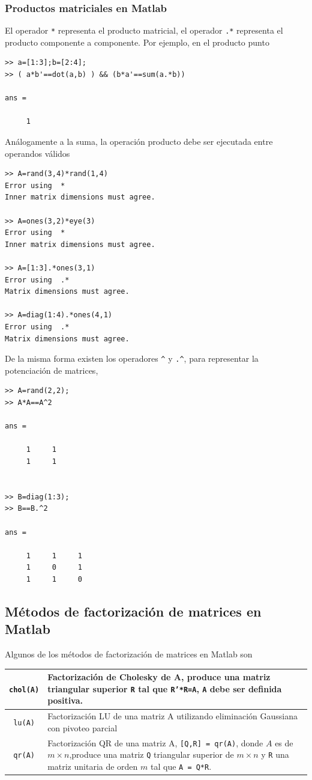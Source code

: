\documentclass[11pt]{article}
\begin{document}
\subsubsection{Productos matriciales en Matlab}
El operador \texttt{*} representa el producto matricial, el operador \texttt{.*} representa el producto componente 
a componente. Por ejemplo, en el producto punto
\begin{verbatim}
>> a=[1:3];b=[2:4];
>> ( a*b'==dot(a,b) ) && (b*a'==sum(a.*b))

ans =

     1
\end{verbatim}
An\'alogamente a la suma, la operaci\'on producto debe ser ejecutada entre operandos v\'alidos
\begin{multicols}{2}
\begin{verbatim}
>> A=rand(3,4)*rand(1,4)
Error using  * 
Inner matrix dimensions must agree.

>> A=ones(3,2)*eye(3)
Error using  * 
Inner matrix dimensions must agree.

>> A=[1:3].*ones(3,1)
Error using  .* 
Matrix dimensions must agree.
 
>> A=diag(1:4).*ones(4,1)
Error using  .* 
Matrix dimensions must agree.
\end{verbatim}
\end{multicols}
De la misma forma existen los operadores \texttt{\^} y \texttt{.\^}, para representar la potenciaci\'on de matrices,
\begin{multicols}{2}
\begin{verbatim}
>> A=rand(2,2);
>> A*A==A^2

ans =

     1     1
     1     1


>> B=diag(1:3);
>> B==B.^2

ans =

     1     1     1
     1     0     1
     1     1     0
\end{verbatim}
\end{multicols}

\subsection{M\'etodos de factorizaci\'on de matrices en Matlab}

Algunos de los m\'etodos de factorizaci\'on de matrices en Matlab son
\begin{longtable}{||c|p{}||}
\hline
\texttt{chol(A)}	&	Factorizaci\'on de Cholesky de A, produce una matriz triangular superior \texttt{R} tal que 
\texttt{R'*R=A}, \texttt{A} debe ser definida positiva.		\\ 	\hline
\texttt{lu(A)}		& 	Factorizaci\'on LU de una matriz A utilizando eliminación Gaussiana con pivoteo parcial	\\	\hline
\texttt{qr(A)}		& 	Factorizaci\'on QR de una matriz A, \texttt{[Q,R] = qr(A)}, donde $A$ es de $m\times n$,produce una matriz \texttt{Q} triangular superior de $m\times n$ y \texttt{R} una matriz unitaria de orden $m$ tal que \texttt{A = Q*R}.	\\	\hline
\end{longtable}
\end{document}
